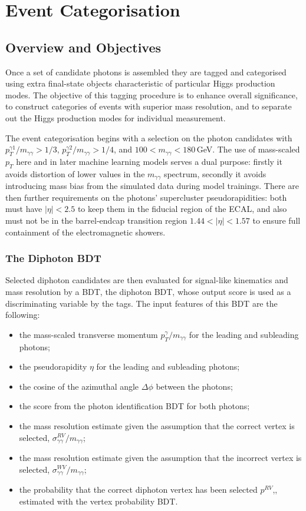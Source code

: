 \chapter{Event Categorisation}
\label{chap:event_select}

\section{Overview and Objectives}
Once a set of candidate photons is assembled they are tagged and categorised using extra final-state objects characteristic of particular Higgs production modes.
The objective of this tagging procedure is to enhance overall significance, to construct categories of events with superior mass resolution, and to separate out the Higgs production modes for individual measurement. 


The event categorisation begins with a selection on the photon candidates with $p_{T}^{\gamma1}/m_{\gamma\gamma} > 1/3$, $p_{T}^{\gamma2}/m_{\gamma\gamma} > 1/4$, and $100 < m_{\gamma\gamma} < 180$\,GeV.
The use of mass-scaled $p_{T}$ here and in later machine learning models serves a dual purpose: firstly it avoids distortion of lower values in the $m_{\gamma\gamma}$ spectrum, secondly it avoids introducing mass bias from the simulated data during model trainings. 
There are then further requirements on the photons' supercluster pseudorapidities: both must have $|\eta| < 2.5$ to keep them in the fiducial region of the ECAL, and also must not be in the barrel-endcap transition region $1.44 < |\eta| < 1.57$ to ensure full containment of the electromagnetic showers. 


\subsection{The Diphoton BDT}
Selected diphoton candidates are then evaluated for signal-like kinematics and mass resolution by a BDT, the diphoton BDT, whose output score is used as a discriminating variable by the tags.
The input features of this BDT are the following:
\begin{itemize}[noitemsep]
    \item the mass-scaled transverse momentum $p^{\gamma}_{T}/m_{\gamma\gamma}$ for the leading and subleading photons;
    \item the pseudorapidity $\eta$ for the leading and subleading photons;
    \item the cosine of the azimuthal angle $\Delta\phi$ between the photons;
    \item the score from the photon identification BDT for both photons;
    \item the mass resolution estimate given the assumption that the correct vertex is selected, $\sigma^{RV}_{\gamma\gamma}/m_{\gamma\gamma}$;
    \item the mass resolution estimate given the assumption that the incorrect vertex is selected, $\sigma^{WV}_{\gamma\gamma}/m_{\gamma\gamma}$;
    \item the probability that the correct diphoton vertex has been selected $p^{RV}$,, estimated with the vertex probability BDT.
\end{itemize}

